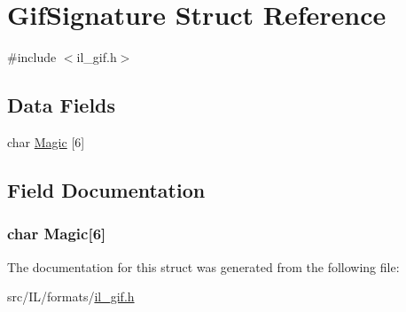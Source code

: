 \hypertarget{struct_gif_signature}{\section{Gif\-Signature Struct Reference}
\label{struct_gif_signature}
}


{\ttfamily \#include $<$il\-\_\-gif.\-h$>$}

\subsection*{Data Fields}
\begin{DoxyCompactItemize}
\item 
char \hyperlink{struct_gif_signature_a1438b7eebf5518f9fe8e698dd42e4ecc}{Magic} \mbox{[}6\mbox{]}
\end{DoxyCompactItemize}


\subsection{Field Documentation}
\hypertarget{struct_gif_signature_a1438b7eebf5518f9fe8e698dd42e4ecc}{
\subsubsection[{Magic}]{\setlength{\rightskip}{0pt plus 5cm}char Magic\mbox{[}6\mbox{]}}}\label{struct_gif_signature_a1438b7eebf5518f9fe8e698dd42e4ecc}


The documentation for this struct was generated from the following file\-:\begin{DoxyCompactItemize}
\item 
src/\-I\-L/formats/\hyperlink{il__gif_8h}{il\-\_\-gif.\-h}\end{DoxyCompactItemize}
